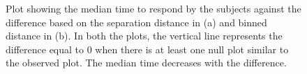 \documentclass[12]{article}
\begin{document}
\begin{figure}[hbtp]
\centering
{}
\label{lp-mtime}
	\vspace{-.1in}
\caption[Optional caption for list of figures]{Plot showing the median time to respond by the subjects against the difference based on the separation distance in (a) and binned distance in (b). In both the plots, the vertical line represents the difference equal to 0 when there is at least one null plot similar to the observed plot. The median time decreases with the difference.  }
\end{figure}
\end{document}
